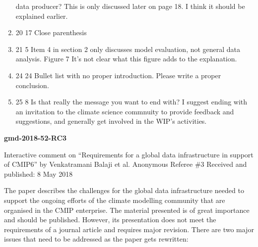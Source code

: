 \documentclass[gmd,manuscript]{copernicus}
\begin{document}
\begin{enumerate}[label=RC2-\arabic*,leftmargin=*]
  data producer? This is only discussed later on page 18. I think it
  should be explained earlier.
\item 20 17 Close parenthesis
\item 21 5 Item 4 in section 2 only discusses model evaluation, not
  general data analysis. Figure 7 It’s not clear what this figure adds
  to the explanation.
\item 24 24 Bullet list with no proper introduction. Please write a
  proper conclusion.
\item 25 8 Is that really the message you want to end with? I suggest
  ending with an invitation to the climate science commnuity to
  provide feedback and suggestions, and generally get involved in the
  WIP’s activities.
\end{enumerate}

\pagebreak


\textbf{gmd-2018-52-RC3}

Interactive comment on “Requirements for a
global data infrastructure in support of CMIP6” by
Venkatramani Balaji et al.
Anonymous Referee \#3
Received and published: 8 May 2018

The paper describes the challenges for the global data infrastructure
needed to support the ongoing efforts of the climate modelling
community that are organised in the CMIP enterprise. The material
presented is of great importance and should be published. However, its
presentation does not meet the requirements of a journal article and
requires major revision. There are two major issues that need to be
addressed as the paper gets rewritten:
\end{document}
